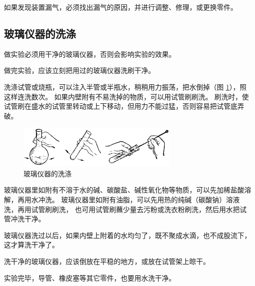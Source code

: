 如果发现装置漏气，必须找出漏气的原因，并进行调整、修理，或更换零件。



\subsection{玻璃仪器的洗涤}

做实验必须用干净的玻璃仪器，否则会影响实验的效果。

做完实验，应该立刻把用过的玻璃仪器洗刷干净。

洗涤试管或烧瓶，可以注入半管或半瓶水，稍稍用力振荡，把水倒掉（图 \ref{fig:xssy-15}），照这样连洗数次。
如果内壁附有不易洗掉的物质，可以用试管刷刷洗。
刷洗时，使试管刷在盛水的试管里转动或上下移动，但用力不能过猛，否则容易把试管底弄破。


\begin{figure}[htbp]
    \centering
    \includegraphics[width=0.7\textwidth]{../pic/czhx1-xssy-15}
    \caption{玻璃仪器的洗涤}\label{fig:xssy-15}
\end{figure}

玻璃仪器里如附有不溶于水的碱、碳酸盐、碱性氧化物等物质，可以先加稀盐酸溶解，再用水冲洗。
玻璃仪器里如附有油脂，可以先用热的纯碱（碳酸钠）溶液洗，再用试管刷刷洗，
也可用试管刷蘸少量去污粉或洗衣粉刷洗，然后用水把试管冲洗干净。

玻璃仪器洗过以后，如果内壁上附着的水均匀了，既不聚成水滴，也不成股流下，这才算洗干净了。

洗干净的玻璃仪器，应该倒放在平稳的地方，或放在试管架上晾干。

实验完毕，导管、橡皮塞等其它零件，也要用水洗干净。

